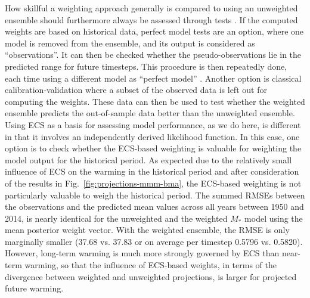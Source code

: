 How skillful a weighting approach generally is compared to using an unweighted ensemble should furthermore always be assessed through tests \citep[][]{abramowitzESDReviewsModel2019}. If the computed weights are based on historical data, perfect model tests are an option, where one model is removed from the ensemble, and its output is considered as ``observations''. It can then be checked whether the pseudo-observations lie in the predicted range for future timesteps. This procedure is then repeatedly done, each time using a different model as ``perfect model'' \citep[e.g., see][]{brunnerReducedGlobalWarming2020}. Another option is classical calibration-validation where a subset of the observed data is left out for computing the weights. These data can then be used to test whether the weighted ensemble predicts the out-of-sample data better than the unweighted ensemble. Using ECS as a basis for assessing model performance, as we do here, is different in that it involves an independently derived likelihood function. 
In this case, one option is to check whether the ECS-based weighting is valuable for weighting the model output for the historical period.
As expected due to the relatively small influence of ECS on the warming in the historical period and after consideration of the results in Fig.~\ref{fig:projections-mmm-bma}, the ECS-based weighting is not particularly valuable to weigh the historical period. The summed RMSEs between the observations and the predicted mean values across all years between 1950 and 2014, is nearly identical for the unweighted and the weighted $M_*$ model using the mean posterior weight vector. With the weighted ensemble, the RMSE is only marginally smaller (37.68 vs. 37.83 or on average per timestep 0.5796 vs. 0.5820).
However, long-term warming is much more strongly governed by ECS than near-term warming, so that the influence of ECS-based weights, in terms of the divergence between weighted and unweighted projections,  is larger for projected future warming.


